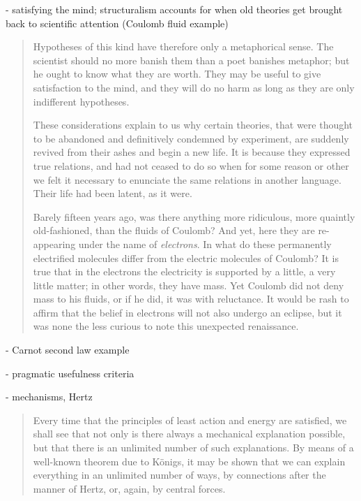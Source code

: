 \documentclass{article}
\begin{document}
  - satisfying the mind; structuralism accounts for when old theories get brought back to scientific attention (Coulomb fluid example)
 
 \begin{quote}
     Hypotheses of this kind have therefore only a metaphorical sense.  The scientist should no more banish them than a poet banishes metaphor; but he ought to know what they are worth.  They may be useful to give satisfaction to the mind, and they will do no harm as long as they are only indifferent hypotheses.  
     
     These considerations explain to us why certain theories, that were thought to be abandoned and definitively condemned by experiment, are suddenly revived from their ashes and begin a new life.  It is because they expressed true relations, and had not ceased to do so when for some reason or other we felt it necessary to enunciate the same relations in another language.  Their life had been latent, as it were.  
     
     Barely fifteen years ago, was there anything more ridiculous, more quaintly old-fashioned, than the fluids of Coulomb?  And yet, here they are re-appearing under the name of \emph{electrons}.  In what do these permanently electrified molecules differ from the electric molecules of Coulomb?  It is true that in the electrons the electricity is supported by a little, a very little matter; in other words, they have mass.  Yet Coulomb did not deny mass to his fluids, or if he did, it was with reluctance.  It would be rash to affirm that the belief in electrons will not also undergo an eclipse, but it was none the less curious to note this unexpected renaissance.
     
     \citep[p. 164-165]{Poincare1952}
 \end{quote}
 
- Carnot second law example
 
 - pragmatic usefulness criteria
 
 - mechanisms, Hertz
 
 \begin{quote}
     Every time that the principles of least action and energy are satisfied, we shall see that not only is there always a mechanical explanation possible, but that there is an unlimited number of such explanations.  By means of a well-known theorem due to K\"onigs, it may be shown that we can explain everything in an unlimited number of ways, by connections after the manner of Hertz, or, again, by central forces.  \citep[p. 167-168]{Poincare1952}
 \end{quote}
 
\end{document}
